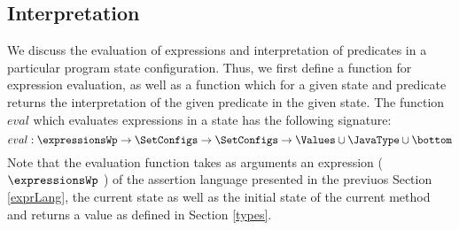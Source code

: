 

\newtheorem{interpExpr}{Definition}[subsection]
\newtheorem{interpTypeExpr}[interpExpr]{Definition} 
\newtheorem{interpPred}[interpExpr]{Definition}


\subsection{Interpretation }\label{interpret}

We discuss the evaluation of expressions and interpretation of predicates  in a particular program state configuration.
Thus, we first define a function for expression evaluation, as well as a function which for a given state and predicate returns the interpretation
of the given predicate in the given state. 
The function $eval$ which evaluates expressions in a state has the following signature:
$$
eval : \expressionsWp \rightarrow \SetConfigs  \rightarrow \SetConfigs  \rightarrow \Values \cup \JavaType \cup \bottom
$$
Note that the evaluation function takes as arguments an expression ($\expressionsWp$ ) of the assertion language presented in the previuos Section 
\ref{exprLang}, the current state as well as the initial state of the current method and returns a value as defined in Section \ref{types}.



